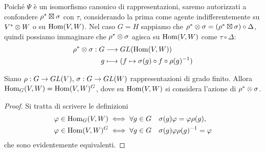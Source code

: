 Poiché $\Psi$ è un isomorfismo canonico di rappresentazioni, saremo autorizzati a confondere $\rho^*\boxtimes\sigma$ con $\tau$, considerando la prima come agente indifferentemente su $V^*\otimes W$ o su $\operatorname{Hom}(V,W)$. Nel caso $G=H$ sappiamo che $\rho^*\otimes\sigma=(\rho^*\boxtimes\sigma)\circ\Delta$, quindi possiamo immaginare che $\rho^*\otimes\sigma$ agisca su $\operatorname{Hom}(V,W)$ come $\tau\circ\Delta$:
\begin{align*}
\rho^*\otimes\sigma:G&\longrightarrow GL(\operatorname{Hom}(V,W))\\
g&\longmapsto(f\mapsto\sigma(g)\circ f\circ\rho(g)^{-1})
\end{align*}

\begin{proposition}
Siano $\rho:G\to GL(V),\,\allowbreak\sigma:G\to GL(W)$ rappresentazioni di grado finito. Allora $\operatorname{Hom}_G(V,W)=\operatorname{Hom}(V,W)^G$, dove su $\operatorname{Hom}(V,W)$ si considera l'azione di $\rho^*\otimes\sigma$.
\end{proposition}
\begin{proof}
Si tratta di scrivere le definizioni
\begin{align*}
\varphi\in\operatorname{Hom}_G(V,W)&\iff\forall g\in G\quad\sigma(g)\varphi=\varphi\rho(g),\\
\varphi\in\operatorname{Hom}(V,W)^G&\iff\forall g\in G\quad\sigma(g)\varphi\rho(g)^{-1}=\varphi
\end{align*}
che sono evidentemente equivalenti.
\end{proof}


